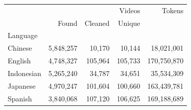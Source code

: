 \begin{tabular}{lrrrr}
\toprule
 & \multicolumn{3}{r}{Videos} & Tokens \\
 & Found & Cleaned & Unique &  \\
Language &  &  &  &  \\
\midrule
Chinese & 5,848,257 & 10,170 & 10,144 & 18,021,001 \\
English & 4,748,327 & 105,964 & 105,733 & 170,750,870 \\
Indonesian & 5,265,240 & 34,787 & 34,651 & 35,534,309 \\
Japanese & 4,970,247 & 101,604 & 100,660 & 163,439,781 \\
Spanish & 3,840,068 & 107,120 & 106,625 & 169,188,689 \\
\bottomrule
\end{tabular}
